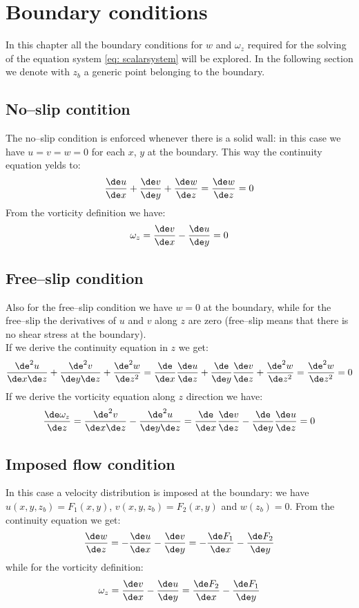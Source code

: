 \chapter{Boundary conditions}
In this chapter all the boundary conditions for $w$ and $\omega_z$ required for the solving of the equation system \ref{eq: scalarsystem} will be explored. In the following section we denote with $z_b$ a generic point belonging to the boundary.

\section{No--slip contition}
The no--slip condition is enforced whenever there is a solid wall: in this case we have $u=v=w=0$ for each $x$, $y$ at the boundary. This way the continuity equation yelds to:
\[
\frac{\de u}{\de x}+\frac{\de v}{\de y}+\frac{\de w}{\de z}=\frac{\de w}{\de z}=0
\]
From the vorticity definition we have:
\[
\omega_z=\frac{\de v}{\de x}-\frac{\de u}{\de y}=0
\]

\section{Free--slip condition}
Also for the free--slip condition we have $w=0$ at the boundary, while for the free--slip the derivatives of $u$ and $v$ along $z$ are zero (free--slip means that there is no shear stress at the boundary).\\
If we derive the continuity equation in $z$ we get:
\[
\frac{\de^2 u}{\de x\de z}+\frac{\de^2 v}{\de y\de z}+\frac{\de^2 w}{\de z^2}=\frac{\de}{\de x}\frac{\de u}{\de z}+\frac{\de}{\de y}\frac{\de v}{\de z}+\frac{\de^2 w}{\de z^2}=\frac{\de^2 w}{\de z^2}=0
\]
If we derive the vorticity equation along $z$ direction we have:
\[
\frac{\de\omega_z}{\de z}=\frac{\de^2 v}{\de x\de z}-\frac{\de^2 u}{\de y\de z}=\frac{\de}{\de x}\frac{\de v}{\de z}-\frac{\de}{\de y}\frac{\de u}{\de z}=0
\]

\section{Imposed flow condition}
In this case a velocity distribution is imposed at the boundary: we have $u(x,y,z_b)=F_1(x,y)$, $v(x,y,z_b)=F_2(x,y)$ and $w(z_b)=0$.
From the continuity equation we get:
\[
\frac{\de w}{\de z}=-\frac{\de u}{\de x}-\frac{\de v}{\de y}=-\frac{\de F_1}{\de x}-\frac{\de F_2}{\de y}
\]
while for the vorticity definition:
\[
\omega_z=\frac{\de v}{\de x}-\frac{\de u}{\de y}=\frac{\de F_2}{\de x}-\frac{\de F_1}{\de y}
\]


